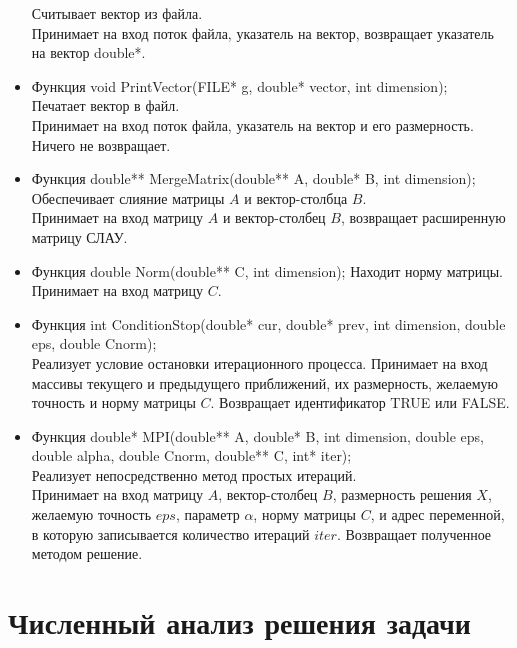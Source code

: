 \documentclass[12pt]{article}
\begin{document}
\begin{itemize}
Считывает вектор из файла.\\
Принимает на вход поток файла, указатель на вектор, возвращает указатель на вектор double*.\\
\item  Функция void PrintVector(FILE* g, double* vector, int dimension);\\
Печатает вектор в файл.\\
Принимает на вход поток файла, указатель на вектор и его размерность. Ничего не возвращает.\\
\item Функция double** MergeMatrix(double** A, double* B, int dimension);\\
Обеспечивает слияние матрицы $A$ и вектор-столбца $B$.\\
Принимает на вход матрицу $A$ и вектор-столбец $B$,  возвращает расширенную матрицу СЛАУ.\\
\item Функция double Norm(double** C, int dimension);
Находит норму матрицы.\\ 
Принимает на вход матрицу $C$.
\item Функция int ConditionStop(double* cur, double* prev, int dimension, double eps, double Cnorm);\\
Реализует условие остановки итерационного процесса. Принимает на вход массивы текущего и предыдущего приближений, их размерность, желаемую точность и норму матрицы $C$. Возвращает идентификатор TRUE или FALSE.
\item Функция double* MPI(double** A, double* B, int dimension, double eps, double alpha, double Cnorm, double** C, int* iter);\\
Реализует непосредственно метод простых итераций.\\
Принимает на вход матрицу $A$, вектор-столбец $B$, размерность решения $X$, желаемую точность $eps$, параметр $\alpha$, норму матрицы $C$, и адрес переменной, в которую записывается количество итераций $iter$. Возвращает полученное методом решение.
\end{itemize}











\section{Численный анализ решения задачи}
\end{document}
